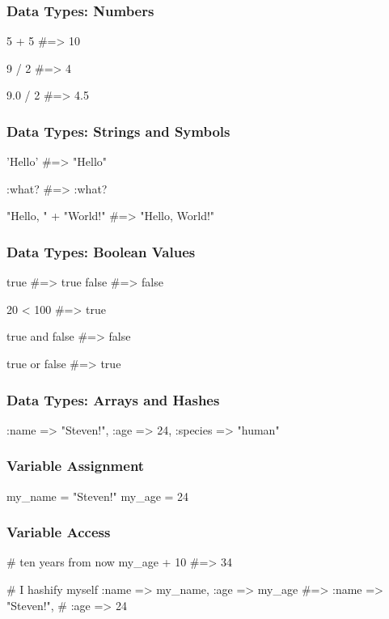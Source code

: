 \documentclass[20pt]{beamer}
\begin{document}
\begin{frame}[fragile]
\frametitle{Data Types: Numbers}
\begin{rubycode}
5 + 5 #=> 10

9 / 2 #=> 4

9.0 / 2 #=> 4.5
\end{rubycode}
\end{frame}

\begin{frame}[fragile]
\frametitle{Data Types: Strings and Symbols}
\begin{rubycode}
'Hello' #=> "Hello"

:what?  #=> :what?

"Hello, " + "World!"
#=> "Hello, World!"
\end{rubycode}
\end{frame}

\begin{frame}[fragile]
\frametitle{Data Types: Boolean Values}
\begin{rubycode}
true #=> true
false #=> false

20 < 100 #=> true

true and false #=> false

true or false #=> true
\end{rubycode}
\end{frame}

\begin{frame}[fragile]
\frametitle{Data Types: Arrays and Hashes}
\begin{rubycode}
[ 1, 2, 3.0, "four" ]

{ :name => "Steven!",
:age => 24,
:species => "human" }
\end{rubycode}
\end{frame}

\begin{frame}[fragile]
\frametitle{Variable Assignment}
\begin{rubycode}
my_name = "Steven!"
my_age = 24
\end{rubycode}
\end{frame}

\begin{frame}[fragile]
\frametitle{Variable Access}
\begin{rubycode}
# ten years from now
my_age + 10 #=> 34

# I hashify myself
{ :name => my_name,
  :age => my_age }
#=> {:name => "Steven!",
#    :age => 24}
\end{rubycode}
\end{frame}
\end{document}
